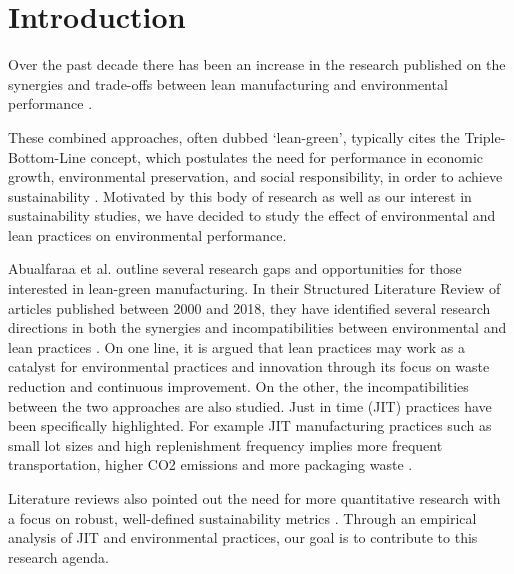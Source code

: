 \section{Introduction}
Over the past decade there has been an increase in the research published on the synergies and trade-offs between lean manufacturing and environmental performance \citep{henaoLeanManufacturingSustainable2019, abualfaraaLeanGreenManufacturingPractices2020, diesteRelationshipLeanEnvironmental2019, lobomesquitaExploringRelationshipsIntegrating2022, garza-reyesLeanGreenSystematic2015, kingLeanGreenEmpirical2009}.

These combined approaches, often dubbed `lean-green', typically cites the Triple-Bottom-Line concept, which postulates the need for performance in economic growth, environmental preservation, and social responsibility, in order to achieve sustainability \citep{henaoLeanManufacturingSustainable2019}. 
Motivated by this body of research as well as our interest in sustainability studies, we have decided to study the effect of environmental and lean practices on environmental performance. 

Abualfaraa et al. outline several research gaps and opportunities for those interested in lean-green manufacturing. 
In their Structured Literature Review of articles published between 2000 and 2018, they have identified several research directions in both the synergies and incompatibilities between environmental and lean practices \citep{abualfaraaLeanGreenManufacturingPractices2020}. 
On one line, it is argued that lean practices may work as a catalyst for environmental practices and innovation through its focus on waste reduction and continuous improvement.
On the other, the incompatibilities between the two approaches are also studied. 
Just in time (JIT) practices have been specifically highlighted. 
For example JIT manufacturing practices such as small lot sizes and high replenishment frequency implies more frequent transportation, higher CO2 emissions and more packaging waste \citep{diesteRelationshipLeanEnvironmental2019}.

Literature reviews also pointed out the need for more quantitative research with a focus on robust, well-defined sustainability metrics \citep{abualfaraaLeanGreenManufacturingPractices2020}. 
Through an empirical analysis of JIT and environmental practices, our goal is to contribute to this research agenda.